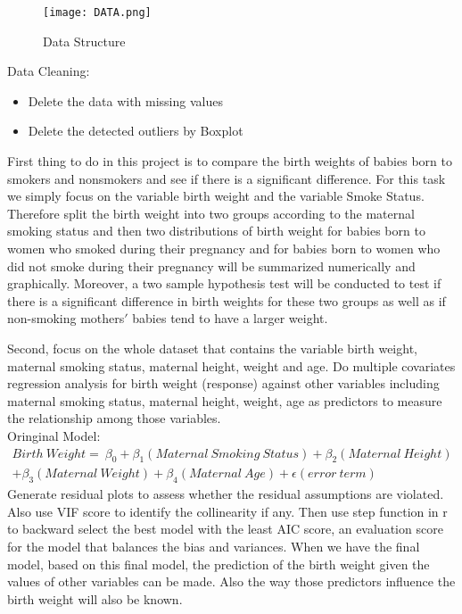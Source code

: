 \documentclass[12pt,letterpaper]{article}
\theoremstyle{definition}
\begin{document}
\begin{figure}[htb]
    \begin{center}
        \texttt{[image: DATA.png]}
    \end{center}
    \caption{Data Structure}
\end{figure}

Data Cleaning: 
\begin{itemize}
         \item Delete the data with missing values
         \item Delete the detected outliers by Boxplot
\end{itemize}

First thing to do in this project is to compare the birth weights of babies born to smokers and nonsmokers and see if there is a significant difference. For this task we simply focus on the variable birth weight and the variable Smoke Status. Therefore split the birth weight into two groups according to the maternal smoking status and then two distributions of birth weight for babies born to women who smoked during their pregnancy and for babies born to women who did not smoke during their pregnancy will be summarized numerically and graphically. Moreover, a two sample hypothesis test will be conducted  to test if there is a significant difference in birth weights for these two groups as well as if non-smoking mothers$'$ babies tend to have a larger weight. 

\indent Second, focus on the whole dataset that contains the variable birth weight, maternal smoking status, maternal height, weight and age. Do multiple covariates regression analysis for birth weight (response) against other variables including maternal smoking status, maternal height, weight, age as predictors to measure the relationship among those variables.\\
Oringinal Model:
\[
\begin{split}
     Birth~Weight=~\beta_0 + \beta_1 (Maternal~Smoking~Status) + \beta_2 (Maternal~Height)\\+ \beta_3(Maternal~Weight) + \beta_4 (Maternal~Age)+ \epsilon(error~term)
\end{split}
\]
\indent Generate residual plots to assess whether the residual assumptions are violated. Also use VIF score to identify the collinearity if any. Then use step function in r to backward select the best model with the least AIC score, an evaluation score for the model that balances the bias and variances. When we have the final model, based on this final model, the prediction of the birth weight given the values of other variables can be made. Also the way those predictors influence the birth weight will also be known.
\end{document}
